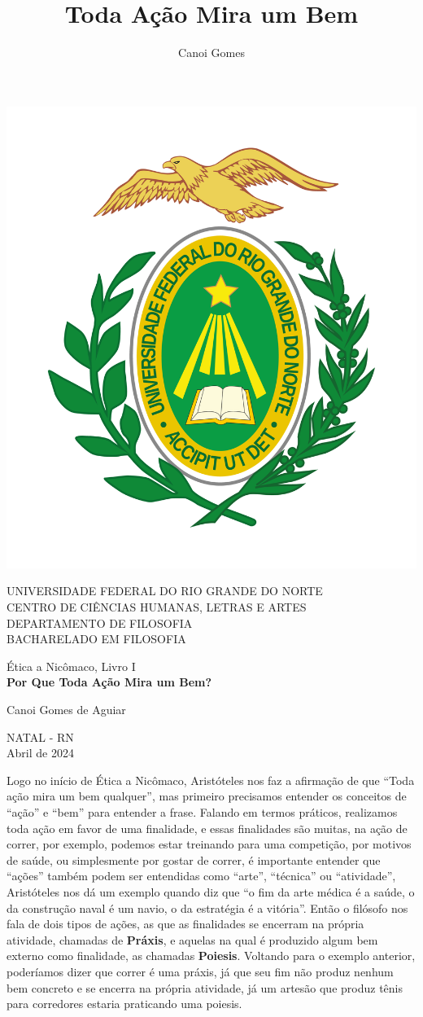 \documentclass[a4paper,oneside,12pt]{article}
\title{Toda Ação Mira um Bem}
\author{Canoi Gomes}
\begin{document}
\begin{center}
    \begin{center}
        \includegraphics[width=.2\linewidth]{../brasao_flat.png}
    \end{center}

    \begin{center}
        UNIVERSIDADE FEDERAL DO RIO GRANDE DO NORTE \\
        CENTRO DE CIÊNCIAS HUMANAS, LETRAS E ARTES \\
        DEPARTAMENTO DE FILOSOFIA \\
        BACHARELADO EM FILOSOFIA
    \end{center}

    \vspace{2cm}

    Ética a Nicômaco, Livro I \\
    \textbf{\Large{Por Que Toda Ação Mira um Bem?}}

    \vspace{4cm}

    \begin{center}
        \large{Canoi Gomes de Aguiar}
    \end{center}

    \vspace{6cm}

    NATAL - RN \\
    Abril de 2024
\end{center}
\newpage

Logo no início de Ética a Nicômaco, Aristóteles nos faz a afirmação de que ``Toda ação mira um bem qualquer'', mas primeiro precisamos entender os conceitos de ``ação'' e ``bem'' para entender a frase. Falando em termos práticos, realizamos toda ação em favor de uma finalidade, e essas finalidades são muitas, na ação de correr, por exemplo, podemos estar treinando para uma competição, por motivos de saúde, ou simplesmente por gostar de correr, é importante entender que ``ações'' também podem ser entendidas como ``arte'', ``técnica'' ou ``atividade'', Aristóteles nos dá um exemplo quando diz que ``o fim da arte médica é a saúde, o da construção naval é um navio, o da estratégia é a vitória''. Então o filósofo nos fala de dois tipos de ações, as que as finalidades se encerram na própria atividade, chamadas de \textbf{Práxis}, e aquelas na qual é produzido algum bem externo como finalidade, as chamadas \textbf{Poiesis}. Voltando para o exemplo anterior, poderíamos dizer que correr é uma práxis, já que seu fim não produz nenhum bem concreto e se encerra na própria atividade, já um artesão que produz tênis para corredores estaria praticando uma poiesis.
\end{document}
